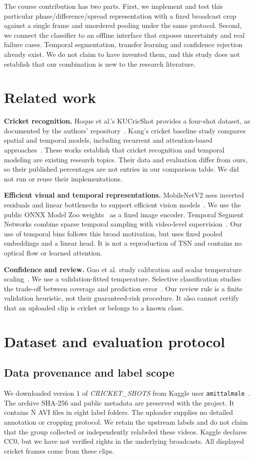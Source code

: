 The course contribution has two parts. First, we implement and test this particular phase/difference/spread representation with a fixed broadcast crop against a single frame and unordered pooling under the same protocol. Second, we connect the classifier to an offline interface that exposes uncertainty and real failure cases. Temporal segmentation, transfer learning and confidence rejection already exist. We do not claim to have invented them, and this study does not establish that our combination is new to the research literature.

\section{Related work}
\textbf{Cricket recognition.} Hoque et al.'s KUCricShot provides a four-shot dataset, as documented by the authors' repository~\cite{kucricshot}. Kang's cricket baseline study compares spatial and temporal models, including recurrent and attention-based approaches~\cite{kang}. These works establish that cricket recognition and temporal modeling are existing research topics. Their data and evaluation differ from ours, so their published percentages are not entries in our comparison table. We did not run or reuse their implementations.

\textbf{Efficient visual and temporal representations.} MobileNetV2 uses inverted residuals and linear bottlenecks to support efficient vision models~\cite{sandler}. We use the public ONNX Model Zoo weights~\cite{onnxmodel} as a fixed image encoder. Temporal Segment Networks combine sparse temporal sampling with video-level supervision~\cite{wang}. Our use of temporal bins follows this broad motivation, but uses fixed pooled embeddings and a linear head. It is not a reproduction of TSN and contains no optical flow or learned attention.

\textbf{Confidence and review.} Guo et al. study calibration and scalar temperature scaling~\cite{guo}. We use a validation-fitted temperature. Selective classification studies the trade-off between coverage and prediction error~\cite{geifman}. Our review rule is a finite validation heuristic, not their guaranteed-risk procedure. It also cannot certify that an uploaded clip is cricket or belongs to a known class.

\section{Dataset and evaluation protocol}
\subsection{Data provenance and label scope}
We downloaded version 1 of \emph{CRICKET\_SHOTS} from Kaggle user \texttt{amittalmale}~\cite{dataset}. The archive SHA-256 and public metadata are preserved with the project. It contains {{N}} AVI files in eight label folders. The uploader supplies no detailed annotation or cropping protocol. We retain the upstream labels and do not claim that the group collected or independently relabeled these videos. Kaggle declares CC0, but we have not verified rights in the underlying broadcasts. All displayed cricket frames come from these clips.

